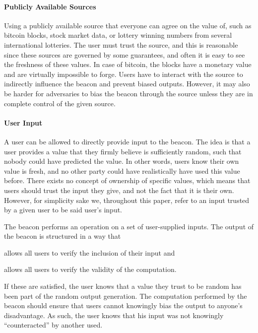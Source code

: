 \paragraph{Publicly Available Sources}
Using a publicly available source that everyone can agree on the value of, such as bitcoin blocks, stock market data, or lottery winning numbers from several international lotteries.
The user must trust the source, and this is reasonable since these sources are governed by some guarantees, and often it is easy to see the freshness of these values.
In case of bitcoin, the blocks have a monetary value and are virtually impossible to forge.
Users have to interact with the source to indirectly influence the beacon and prevent biased outputs.
However, it may also be harder for adversaries to bias the beacon through the source unless they are in complete control of the given source.

\paragraph{User Input}
A user can be allowed to directly provide input to the beacon.
The idea is that a user provides a value that they firmly believe is sufficiently random, such that nobody could have predicted the value. In other words, users know their own value is fresh, and no other party could have realistically have used this value before.
There exists no concept of ownership of specific values, which means that users should trust the input they give, and not the fact that it is their own.
However, for simplicity sake we, throughout this paper, refer to an input trusted by a given user to be said user's input.

The beacon performs an operation on a set of user-supplied inputs.
The output of the beacon is structured in a way that
\begin{eletterate*}
    \item allows all users to verify the inclusion of their input and
    \item allows all users to verify the validity of the computation.
\end{eletterate*}

If these are satisfied, the user knows that a value they trust to be random has been part of the random output generation.
The computation performed by the beacon should ensure that users cannot knowingly bias the output to anyone's disadvantage.
As such, the user knows that his input was not knowingly \enquote{counteracted} by another used.

